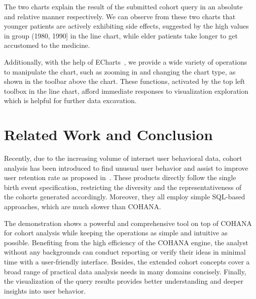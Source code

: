 The two charts explain the result of the submitted cohort query in an absolute and relative manner respectively. We can observe from these two charts that younger patients are actively exhibiting side effects, suggested by the high values in group (1980, 1990] in the line chart, while elder patients take longer to get accustomed to the medicine.%

Additionally, with the help of ECharts~\cite{echarts}, we provide a wide variety of operations to manipulate the chart, such as zooming in and changing the chart type, as shown in the toolbar above the chart. These functions, activated by the top left toolbox in the line chart, afford immediate responses to visualization exploration which is helpful for further data excavation.

\section{Related Work and Conclusion}

Recently, due to the increasing volume of internet user behavioral data, cohort
analysis has been introduced to find unusual user behavior and assist to
improve user retention rate as proposed in~\cite{amplitude, mixpanel, rjmetrics}. These
products directly follow the single birth event specification, restricting the diversity and the representativeness of the cohorts generated accordingly.
Moreover, they all employ simple SQL-based approaches, which are much slower than COHANA.

The demonstration shows a powerful and comprehensive tool on top of COHANA for cohort analysis while keeping the operations as simple and intuitive as possible. Benefiting from the high efficiency of the COHANA engine, the analyst without any backgrounds can conduct reporting or verify their ideas in minimal time with a user-friendly interface. Besides, the extended cohort concepts cover a broad range of practical data analysis needs in many domains concisely. Finally, the visualization of the query results provides better understanding and deeper insights into user behavior.
